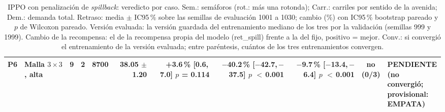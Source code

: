 \begin{table}[H]
\begin{tabular}{llcrrrrrrcl}
P6 & \makecell[l]{Malla $3 \times 3$,\\{}alta} & 9 & 2 & 8700 & \makecell[r]{38.05\\{}$\pm$ 1.20} & \makecell[r]{+3.6\,\%\\{}[0.6,\,7.0]\\$p$ = 0.114} & \makecell[r]{$-$40.2\,\%\\{}[$-$42.7,\,$-$37.5]\\$p$ $<$\,0.001} & \makecell[r]{$-$9.7\,\%\\{}[$-$13.4,\,$-$6.4]\\$p$ $<$\,0.001} & \makecell[c]{no\\{}(0/3)} & \makecell[l]{PENDIENTE\\{}(no convergió;\\{}provisional:\\{}EMPATA)} \\
\bottomrule
\end{tabular}
\caption[Veredicto de IPPO con penalización de \textit{spillback}]{IPPO con penalización de \textit{spillback}: veredicto por caso. Sem.: semáforos (rot.: más una rotonda); Carr.: carriles por sentido de la avenida; Dem.: demanda total. Retraso: media $\pm$ IC95\,\% sobre las semillas de evaluación 1001 a 1030; cambio (\%) con IC95\,\% bootstrap pareado y $p$ de Wilcoxon pareado. Versión evaluada: la versión guardada del entrenamiento mediano de los tres por la validación (semillas 999 y 1999). Cambio de la recompensa: el de la recompensa propia del modelo (ret\_spill) frente a la del fijo, positivo = mejor. Conv.: si convergió el entrenamiento de la versión evaluada; entre paréntesis, cuántos de los tres entrenamientos convergen.}
\label{tab:veredicto-ippo-spill}
\end{table}
